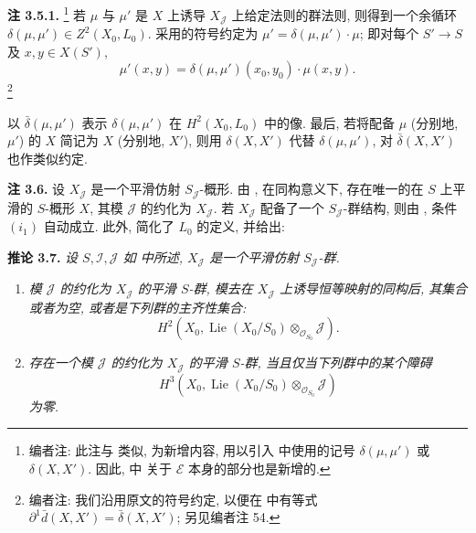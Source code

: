 \medskip
\noindent{}\textbf{注 3.5.1.}
\footnote{编者注: 此注与  类似,
为新增内容, 用以引入 
中使用的记号 \(\delta(\mu,\mu')\) 或 \(\delta(X,X')\).
因此,  中
关于 \(\mathcal E\) 本身的部分也是新增的.}
若 \(\mu\) 与 \(\mu'\) 是 \(X\) 上诱导 \(X_{\mathscr J}\) 上给定法则的群法则,
则得到一个余循环 \(\delta(\mu,\mu')\in Z^2(X_0,L_0)\).
采用的符号约定为 \(\mu'=\delta(\mu,\mu')\cdot\mu\);
即对每个 \(S'\to S\) 及 \(x,y\in X(S')\),
\[
 \mu'(x,y)=\delta(\mu,\mu')(x_0,y_0)\cdot\mu(x,y).
\]
\footnote{编者注: 我们沿用原文的符号约定,
以便在  中有等式
\(\partial^1\bar d(X,X')=\bar\delta(X,X')\); 另见编者注 54.}

以 \(\bar\delta(\mu,\mu')\) 表示 \(\delta(\mu,\mu')\)
在 \(H^2(X_0,L_0)\) 中的像.
最后, 若将配备 \(\mu\) (分别地, \(\mu'\)) 的 \(X\)
简记为 \(X\) (分别地, \(X'\)), 则用 \(\delta(X,X')\)
代替 \(\delta(\mu,\mu')\), 对 \(\bar\delta(X,X')\) 也作类似约定.

\medskip
\noindent{}\textbf{注 3.6.}
设 \(X_{\mathscr J}\) 是一个平滑仿射 \(S_{\mathscr J}\)-概形.
由 , 在同构意义下,
存在唯一的在 \(S\) 上平滑的 \(S\)-概形 \(X\),
其模 \(\mathscr J\) 的约化为 \(X_{\mathscr J}\).
若 \(X_{\mathscr J}\) 配备了一个 \(S_{\mathscr J}\)-群结构,
则由 , 条件 \((i_1)\) 自动成立.
此外,  简化了 \(L_0\) 的定义, 并给出:

\medskip
\noindent{}\textbf{推论 3.7.}
\textit{设 \(S,\mathscr I,\mathscr J\) 如 
中所述, \(X_{\mathscr J}\) 是一个平滑仿射 \(S_{\mathscr J}\)-群.}
\begin{enumerate}
\item[(i)] \textit{模 \(\mathscr J\) 的约化为 \(X_{\mathscr J}\)
的平滑 \(S\)-群, 模去在 \(X_{\mathscr J}\) 上诱导恒等映射的同构后,
其集合或者为空, 或者是下列群的主齐性集合:}
\[
 H^2\!\left(
  X_0,\operatorname{Lie}(X_0/S_0)
  \otimes_{\mathscr O_{S_0}}\mathscr J
 \right).
\]
\item[(ii)] \textit{存在一个模 \(\mathscr J\) 的约化为
\(X_{\mathscr J}\) 的平滑 \(S\)-群,
当且仅当下列群中的某个障碍}
\[
 H^3\!\left(
  X_0,\operatorname{Lie}(X_0/S_0)
  \otimes_{\mathscr O_{S_0}}\mathscr J
 \right)
\]
\textit{为零.}
\end{enumerate}

